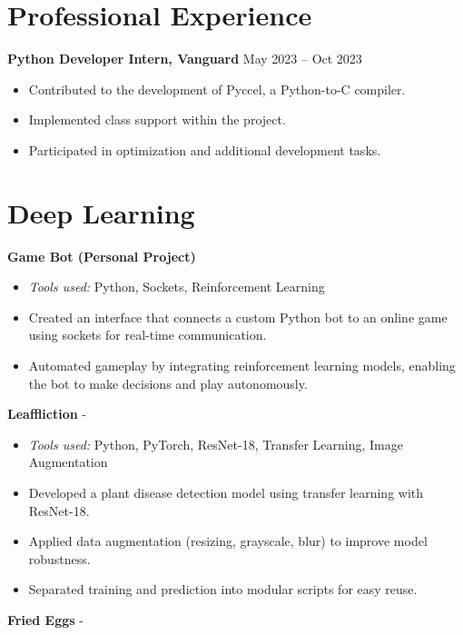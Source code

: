 \documentclass[a4paper,11pt]{article}%
\begin{document}
\section*{Professional Experience}%
\textbf{Python Developer Intern, Vanguard} \hfill May 2023 -- Oct 2023%
\begin{itemize}[leftmargin=*]%
\item Contributed to the development of Pyccel, a Python-to-C compiler.%
\item Implemented class support within the project.%
\item Participated in optimization and additional development tasks.%
\end{itemize}%
\section*{Deep Learning}%
%
\noindent \textbf{Game Bot (Personal Project)}%
\begin{itemize}[leftmargin=2em,label={},parsep=0pt,topsep=1em]%
\item \textit{Tools used:} Python, Sockets, Reinforcement Learning%
\item Created an interface that connects a custom Python bot to an online game using sockets for real-time communication.%
\item Automated gameplay by integrating reinforcement learning models, enabling the bot to make decisions and play autonomously.%
\end{itemize}%
%
\noindent \textbf{Leaffliction} - \href{https://github.com/sboof911/Leaffliction}{{}}%
\begin{itemize}[leftmargin=2em,label={},parsep=0pt,topsep=1em]%
\item \textit{Tools used:} Python, PyTorch, ResNet-18, Transfer Learning, Image Augmentation%
\item Developed a plant disease detection model using transfer learning with ResNet-18.%
\item Applied data augmentation (resizing, grayscale, blur) to improve model robustness.%
\item Separated training and prediction into modular scripts for easy reuse.%
\end{itemize}%
%
\noindent \textbf{Fried Eggs} - \href{https://github.com/sboof911/Fried-eggs}{{}}%
\end{document}
